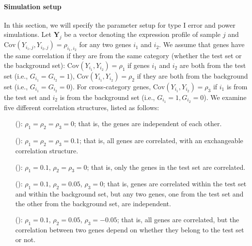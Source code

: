 	\paragraph{Simulation setup}\label{subsection:simulation}
	In this section, we will specify the parameter setup for type I error and power simulations. 
	Let $\bm Y_{j}$ be a vector denoting the expression profile of sample $j$ and 
	$\text{Cov}(Y_{i_1, j}, Y_{i_2, j})=\rho_{i_1,i_2}$ for any two genes $i_1$ and $i_2$. 
	We assume that genes have the same correlation if they are from the same category (whether the 
	test set or the background set): $\text{Cov}(Y_{i_1}, Y_{i_2})= \rho_1$ if
	genes $i_1$ and $i_2$ are both from the test set (i.e., $G_{i_1} = G_{i_2}=1$), 
	$\text{Cov}(Y_{i_1}, Y_{i_2}) =\rho_2$ if they are both from the background set (i.e., $G_{i_1} 
	=
	G_{i_2}=0$). For cross-category genes,  $\text{Cov}(Y_{i_1}, Y_{i_2})= \rho_3$ if $i_1$ is from 
	the test set and 
	$i_2$ is
	from the background set (i.e., $G_{i_1} =1,  G_{i_2}=0$). We examine five different correlation
	structures, listed as follows:
	
	\begin{enumerate}
		\item[(\aaCase):] $\rho_1 = \rho_2 = \rho_3 = 0$; that is, the genes are independent of each
		other.
		\item[(\cCase):] $\rho_1 = \rho_2 = \rho_3 = 0.1$; that is, all genes are correlated, with 
		an
		exchangeable correlation structure. 
		\item[(\aCase):] $\rho_1 = 0.1$, $\rho_2 = \rho_3 = 0$; that is, only the genes in the test 
		set
		are correlated.%
		\item[(\eCase):] $\rho_1 = 0.1$, $\rho_2 = 0.05$, $\rho_3 = 0$; that is, 
		genes are correlated within the test set and within the background set, but any two genes, 
		one
		from the test set and the other from the background set, are independent.
		\item[(\fCase):] $\rho_1 = 0.1$, $\rho_2 = 0.05$, $\rho_3 = -0.05$; that is, all genes are
		correlated, but the correlation between two genes depend on whether they belong to the test 
		set or
		not.
	\end{enumerate}
	
